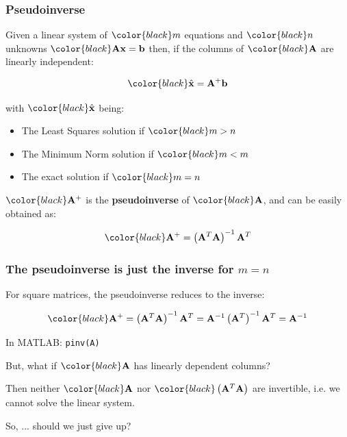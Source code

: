\documentclass[compress]{beamer}
\newcommand{\black}[1]{{\color{black}#1}}
\renewcommand{\emph}[1]{\textbf{\black{#1}}}
\newcommand{\beq}[1]{\[\black{#1}\]}
\begin{document}

\begin{frame}
\frametitle{Pseudoinverse}

Given a linear system of $\black{m}$ equations and $\black{n}$ unknowns $\black{\A\x = \b}$ then, if the columns of $\black{\A}$ are linearly independent:

\beq{
\hat{\x} = \A^+\b
}

with $\black{\hat{\x}}$ being:

\begin{itemize}
\item The Least Squares solution if $\black{m > n}$
\item The Minimum Norm solution if $\black{m < m}$
\item The exact solution if $\black{m=n}$
\end{itemize}

\vspace{.5cm}
$\black{\A^+}$ is the \emph{pseudoinverse} of $\black{\A}$, and can be easily obtained as:

\beq{
\A^+ = \left(\A^T\A\right)^{-1}\A^T
}


\end{frame}




\begin{frame}[fragile]
\frametitle{The pseudoinverse is just the inverse for $m=n$}

For square matrices, the pseudoinverse reduces to the inverse:

\beq{
\A^+ = \left(\A^T\A\right)^{-1}\A^T = \A^{-1}\left(\A^T\right)^{-1}\A^T =  \A^{-1}
}

\vspace{.5cm}
In MATLAB: \color{black}\verb|pinv(A)|\color{gray}

\vspace{.5cm}
But, what if $\black{\A}$ has linearly dependent columns?

\vspace{.5cm}
Then neither $\black{\A}$ nor $\black{\left(\A^T\A\right)}$ are invertible, i.e. we cannot solve the linear system.

\vspace{.5cm}
\alert{So, ... should we just give up?}

\end{frame}


\end{document}
